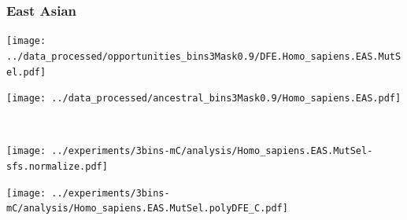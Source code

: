 \subsubsection{East Asian}

\begin{minipage}{0.49\linewidth}
    \texttt{[image: ../data\_processed/opportunities\_bins3Mask0.9/DFE.Homo\_sapiens.EAS.MutSel.pdf]}
\end{minipage}
\begin{minipage}{0.49\linewidth}
    \texttt{[image: ../data\_processed/ancestral\_bins3Mask0.9/Homo\_sapiens.EAS.pdf]}
\end{minipage}
\\
\begin{minipage}{0.49\linewidth}
    \texttt{[image: ../experiments/3bins-mC/analysis/Homo\_sapiens.EAS.MutSel-sfs.normalize.pdf]}
\end{minipage}
\begin{minipage}{0.4\linewidth}
    \texttt{[image: ../experiments/3bins-mC/analysis/Homo\_sapiens.EAS.MutSel.polyDFE\_C.pdf]}
\end{minipage}
